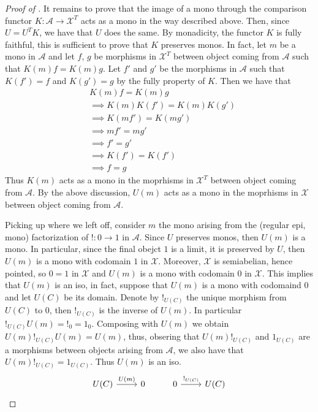 \begin{subbox}{}
\begin{proof}[\textit{Proof of }]
    It remains to prove that the image of a mono through the comparison functor $K : \mathcal{A} \to \mathcal{X}^T$ acts as a mono in the way described above. Then, since $U=U^TK$, we have that $U$ does the same. By monadicity, the functor $K$ is fully faithful, this is sufficient to prove that $K$ preserves monos. In fact, let $m$ be a mono in $\mathcal{A}$ and let $f$, $g$ be morphisms in $\mathcal{X}^T$ between object coming from $\mathcal{A}$ such that $K(m)f = K(m)g$. Let $f'$ and $g'$ be the morphisms in $\mathcal{A}$ such that $K(f') = f$ and $K(g') = g$ by the fully property of $K$. Then we have that
    \begin{align*}
    &K(m)f = K(m)g\\[1.5ex]
    &\implies K(m) K(f') = K(m) K(g')\\[1.5ex]
    &\implies K(mf') = K(mg')\\[1.5ex]
    &\implies mf' = mg'\\[1.5ex]
    &\implies f' = g'\\[1.5ex]
    &\implies K(f') = K(f')\\[1.5ex]
    &\implies f = g
    \end{align*}
    Thus $K(m)$ acts as a mono in the moprhisms in $\mathcal{X}^T$ between object coming from $\mathcal{A}$. By the above discussion, $U(m)$ acts as a mono in the moprhisms in $\mathcal{X}$ between object coming from $\mathcal{A}$.

    Picking up where we left off, consider $m$ the mono arising from the (regular epi, mono) factorization of $!:0 \to 1$ in $\mathcal{A}$. Since $U$ preserves monos, then $U(m)$ is a mono. In particular, since the final obejct $1$ is a limit, it is preserved by $U$, then $U(m)$ is a mono with codomain $1$ in $\mathcal{X}$. Moreover, $\mathcal{X}$ is semiabelian, hence pointed, so $0=1$ in $\mathcal{X}$ and $U(m)$ is a mono with codomain $0$ in $\mathcal{X}$. This implies that $U(m)$ is an iso, in fact, suppose that $U(m)$ is a mono with codomaind $0$ and let $U(C)$ be its domain. Denote by $!_{U(C)}$ the unique morphism from $U(C)$ to $0$, then $!_{U(C)}$ is the inverse of $U(m)$. In particular $!_{U(C)}U(m)=!_0=1_0$. Composing with $U(m)$ we obtain $U(m)!_{U(C)}U(m)=U(m)$, thus, obsering that $U(m)!_{U(C)}$ and $1_{U(C)}$ are a morphisms between objects arising from $\mathcal{A}$, we also have that $U(m)!_{U(C)}=1_{U(C)}$. Thus $U(m)$ is an iso.
    \[
\begin{tikzcd}
U(C) \arrow[r, "U(m)"] & 0 & 0 \arrow[r, "!_{U(C)}"] & U(C)
\end{tikzcd}
    \]
    

\end{proof}
\end{subbox}

